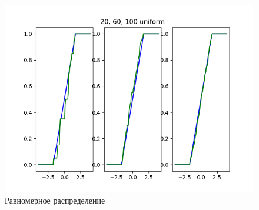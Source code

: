 \documentclass[a4]{article}
\begin{document}
\begin{center}
\begin{figure}[h!]
				\includegraphics[width=\textwidth]{uniformemp.png}
				\caption[Равномерное распределение]{Равномерное распределение}
			\end{figure}
		\newpage
			
		\end{center}
\end{document}
